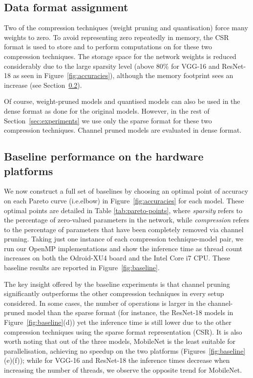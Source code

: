 \documentclass[conference]{IEEEtran}
\begin{document}
\subsection{Data format assignment}

Two of the compression techniques (weight pruning and quantisation) force many weights to zero. To avoid representing zero repeatedly in memory, the CSR format is used to store and to perform computations on for these two compression techniques. The storage space for the network weights is reduced considerably due to the large sparsity level (above 80\% for VGG-16 and ResNet-18 as seen in Figure~\ref{fig:accuracies}), although the memory footprint sees an increase (see Section~\ref{subsec:hardware}).  

Of course, weight-pruned models and quantised models can also be used in the dense format as done for the original models. However, in the rest of Section~\ref{sec:experiments} we use only the sparse format for these two compression techniques. Channel pruned models are evaluated in dense format.

\subsection{Baseline performance on the hardware platforms}\label{subsec:hardware}

We now construct a full set of baselines by choosing an optimal point of accuracy on each Pareto curve (i.e.\the elbow) in Figure~\ref{fig:accuracies} for each model. These optimal points are detailed in Table \ref{tab:pareto-points}, where \textit{sparsity} refers to the percentage of zero-valued parameters in the network, while \textit{compression} refers to the percentage of parameters that have been completely removed via channel pruning. Taking just one instance of each compression technique-model pair, we run our OpenMP implementations and show the inference time as thread count increases on both the Odroid-XU4 board and the Intel Core i7 CPU. These baseline results are reported in Figure~\ref{fig:baseline}. 

The key insight offered by the baseline experiments is that channel pruning significantly outperforms the other compression techniques in every setup considered. In some cases, the number of operations is larger in the channel-pruned model than the sparse format (for instance, the ResNet-18 models in Figure~\ref{fig:baseline}(d)) yet the inference time is still lower due to the other compression techniques using the sparse format representation (CSR). It is also worth noting that out of the three models, MobileNet is the least suitable for parallelisation, achieving no speedup on the two platforms (Figures~\ref{fig:baseline}(e)(f)); while for VGG-16 and ResNet-18 the inference times decrease when increasing the number of threads, we observe the opposite trend for MobileNet.
\end{document}
